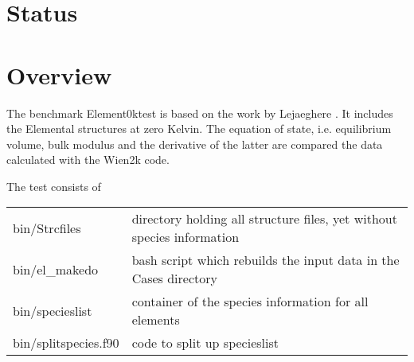 \documentclass{book}
\begin{document}
\section*{Status}



\section*{Overview}
The benchmark Element0ktest is based on the work by Lejaeghere
\cite{lejaeghere14_critrevsolstmatsci39_1,lejaeghere13_arxiv1204_2733}.
It includes the Elemental structures at zero Kelvin. The equation of
state, i.e. equilibrium volume, bulk modulus and the derivative of the
latter are compared the data calculated with the Wien2k code.

The test consists of
\begin{center}
\begin{tabular}{|l|l|}
\hline
bin/Strcfiles & directory holding all structure files, yet without species
information \\
bin/el\_makedo & bash script which rebuilds the input data in the Cases directory \\
bin/specieslist & container of the species information for all elements\\
bin/splitspecies.f90 & code to split up specieslist\\
\hline
\end{tabular}
\end{center}
\end{document}
